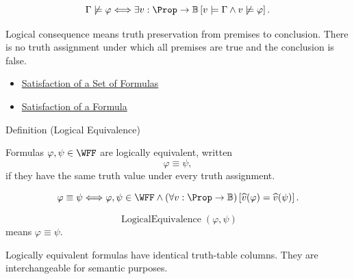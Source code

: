 \begin{remark*}
\[
\Gamma\not\models\varphi
\Longleftrightarrow
\exists v:\Prop\to\mathbb{B}
\left[
v\models\Gamma
\land
v\not\models\varphi
\right].
\]
\end{remark*}

\begin{remark*}[Interpretation]
Logical consequence means truth preservation from premises to conclusion. There is no truth assignment under which all premises are true and the conclusion is false.
\end{remark*}

\begin{dependencies}
\begin{itemize}
  \item \hyperref[def:satisfaction-set-propositional-logic]{Satisfaction of a Set of Formulas}
  \item \hyperref[def:satisfaction-propositional-formula]{Satisfaction of a Formula}
\end{itemize}
\end{dependencies}
\begin{definitionbox}{Definition (Logical Equivalence)}
\begin{definition}
\label{def:logical-equivalence-propositional-logic}
Formulas \(\varphi,\psi\in\WFF\) are logically equivalent, written
\[
\varphi\equiv\psi,
\]
if they have the same truth value under every truth assignment.
\end{definition}
\end{definitionbox}

\begin{remark*}
\[
\varphi\equiv\psi
\Longleftrightarrow
\varphi,\psi\in\WFF
\land
(\forall v:\Prop\to\mathbb{B})
\left[
\widehat v(\varphi)=\widehat v(\psi)
\right].
\]
\end{remark*}

\begin{remark*}
\[
\operatorname{LogicalEquivalence}(\varphi,\psi)
\]
means \(\varphi\equiv\psi\).
\end{remark*}

\begin{remark*}[Interpretation]
Logically equivalent formulas have identical truth-table columns. They are interchangeable for semantic purposes.
\end{remark*}

